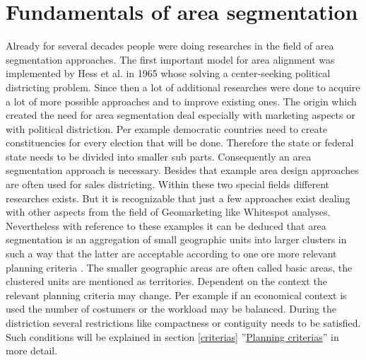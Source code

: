 \section{Fundamentals of area segmentation}\label{Fundamentals}

Already for several decades people were doing researches in the field of area segmentation approaches. The first important model for area alignment was implemented by Hess et al. in 1965 whose solving a center-seeking political districting problem\cite{hess}. Since then a lot of additional researches were done to acquire a lot of more possible approaches and to improve existing ones. The origin which created the need for area segmentation deal especially with marketing aspects or with political distriction. Per example democratic countries need to create constituencies for every election that will be done. Therefore the state or federal state needs to be divided into smaller sub parts. Consequently an area segmentation approach is necessary. Besides that example area design approaches are often used for sales districting. Within these two special fields different researches exists. But it is recognizable that just a few approaches exist dealing with other aspects from the field of Geomarketing like Whitespot analyses. Nevertheless with reference to these examples it can be deduced that area segmentation is an aggregation of small geographic units into larger clusters in such a way that the latter are acceptable according to one ore more relevant planning criteria \cite{kalcsics, zoltner}. The smaller geographic areas are often called basic areas, the clustered units are mentioned as territories. Dependent on the context the relevant planning criteria may change. Per example if an economical context is used the number of costumers or the workload may be balanced. During the distriction several restrictions like compactness or contiguity needs to be satisfied. Such conditions will be explained in section \ref{criterias} ''\hyperref[criterias]{Planning criterias}'' in more detail. \\
